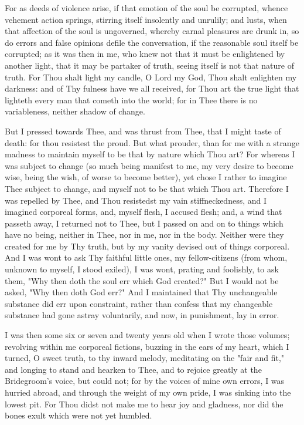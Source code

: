 \documentclass[b5paper,openright,12pt,twoside]{book}
\begin{document}
For as deeds of violence arise, if that emotion of the soul be
corrupted, whence vehement action springs, stirring itself insolently
and unrulily; and lusts, when that affection of the soul is ungoverned,
whereby carnal pleasures are drunk in, so do errors and false opinions
defile the conversation, if the reasonable soul itself be corrupted; as
it was then in me, who knew not that it must be enlightened by another
light, that it may be partaker of truth, seeing itself is not that
nature of truth. For Thou shalt light my candle, O Lord my God, Thou
shalt enlighten my darkness: and of Thy fulness have we all received,
for Thou art the true light that lighteth every man that cometh into the
world; for in Thee there is no variableness, neither shadow of change.

But I pressed towards Thee, and was thrust from Thee, that I might taste
of death: for thou resistest the proud. But what prouder, than for me
with a strange madness to maintain myself to be that by nature which
Thou art? For whereas I was subject to change (so much being manifest
to me, my very desire to become wise, being the wish, of worse to become
better), yet chose I rather to imagine Thee subject to change, and
myself not to be that which Thou art. Therefore I was repelled by Thee,
and Thou resistedst my vain stiffneckedness, and I imagined corporeal
forms, and, myself flesh, I accused flesh; and, a wind that passeth
away, I returned not to Thee, but I passed on and on to things which
have no being, neither in Thee, nor in me, nor in the body. Neither were
they created for me by Thy truth, but by my vanity devised out of
things corporeal. And I was wont to ask Thy faithful little ones, my
fellow-citizens (from whom, unknown to myself, I stood exiled), I was
wont, prating and foolishly, to ask them, "Why then doth the soul err
which God created?" But I would not be asked, "Why then doth God
err?" And I maintained that Thy unchangeable substance did err upon
constraint, rather than confess that my changeable substance had gone
astray voluntarily, and now, in punishment, lay in error.

I was then some six or seven and twenty years old when I wrote those
volumes; revolving within me corporeal fictions, buzzing in the ears
of my heart, which I turned, O sweet truth, to thy inward melody,
meditating on the "fair and fit," and longing to stand and hearken to
Thee, and to rejoice greatly at the Bridegroom's voice, but could not;
for by the voices of mine own errors, I was hurried abroad, and through
the weight of my own pride, I was sinking into the lowest pit. For Thou
didst not make me to hear joy and gladness, nor did the bones exult
which were not yet humbled.
\end{document}
